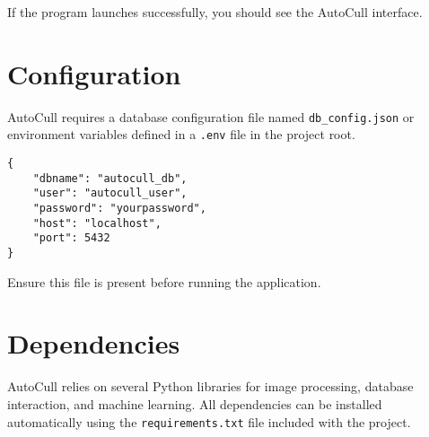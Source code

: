 \documentclass[12pt,a4paper]{article}
\begin{document}
If the program launches successfully, you should see the AutoCull interface.



\section{Configuration}

AutoCull requires a database configuration file named \texttt{db\_config.json} or environment variables defined in a \texttt{.env} file in the project root.

\begin{lstlisting}[style=console]
{
    "dbname": "autocull_db",
    "user": "autocull_user",
    "password": "yourpassword",
    "host": "localhost",
    "port": 5432
}
\end{lstlisting}

Ensure this file is present before running the application.


\section{Dependencies}

AutoCull relies on several Python libraries for image processing, database interaction, and machine learning.  
All dependencies can be installed automatically using the \texttt{requirements.txt} file included with the project.
\end{document}
